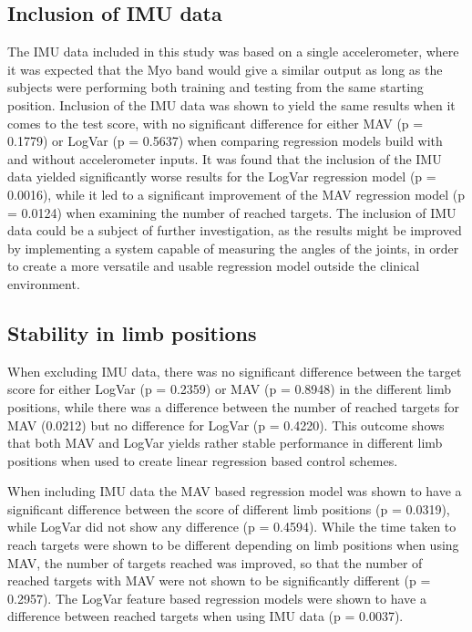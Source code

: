 \subsection{Inclusion of IMU data}
The IMU data included in this study was based on a single accelerometer, where it was expected that the Myo band would give a similar output as long as the subjects were performing both training and testing from the same starting position. Inclusion of the IMU data was shown to yield the same results when it comes to the test score, with no significant difference for either MAV (p = 0.1779) or LogVar (p = 0.5637) when comparing regression models build with and without accelerometer inputs. It was found that the inclusion of the IMU data yielded significantly worse results for the LogVar regression model (p = 0.0016), while it led to a significant improvement of the MAV regression model (p = 0.0124) when examining the number of reached targets. The inclusion of IMU data could be a subject of further investigation, as the results might be improved by implementing a system capable of measuring the angles of the joints, in order to create a more versatile and usable regression model outside the clinical environment.  

\subsection{Stability in limb positions}
When excluding IMU data, there was no significant difference between the target score for either LogVar (p = 0.2359) or MAV (p = 0.8948) in the different limb positions, while there was a difference between the number of reached targets for MAV (0.0212) but no difference for LogVar (p = 0.4220). This outcome shows that both MAV and LogVar yields rather stable performance in different limb positions when used to create linear regression based control schemes.

When including IMU data the MAV based regression model was shown to have a significant difference between the score of different limb positions (p = 0.0319), while LogVar did not show any difference (p = 0.4594). While the time taken to reach targets were shown to be different depending on limb positions when using MAV, the number of targets reached was improved, so that the number of reached targets with MAV were not shown to be significantly different (p = 0.2957). The LogVar feature based regression models were shown to have a difference between reached targets when using IMU data (p = 0.0037).

